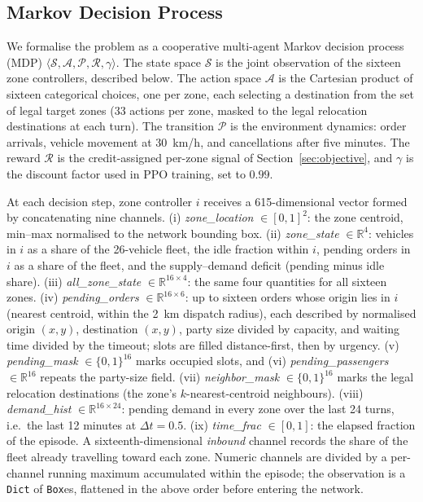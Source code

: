 \documentclass[conference]{IEEEtran}
\begin{document}
\subsection{Markov Decision Process}
\label{sec:mdp}

We formalise the problem as a cooperative multi-agent Markov decision process
(MDP) $\langle \mathcal{S}, \mathcal{A}, \mathcal{P}, \mathcal{R}, \gamma
\rangle$. The state space $\mathcal{S}$ is the joint observation of the sixteen
zone controllers, described below. The action space $\mathcal{A}$ is the
Cartesian product of sixteen categorical choices, one per zone, each selecting
a destination from the set of legal target zones (33 actions per zone, masked
to the legal relocation destinations at each turn). The transition
$\mathcal{P}$ is the environment dynamics: order arrivals, vehicle movement at
30~km/h, and cancellations after five minutes. The reward $\mathcal{R}$ is the
credit-assigned per-zone signal of Section~\ref{sec:objective}, and $\gamma$
is the discount factor used in PPO training, set to $0.99$.

At each decision step, zone controller $i$ receives a 615-dimensional vector
formed by concatenating nine channels. (i) \emph{zone\_location}
$\in[0,1]^2$: the zone centroid, min--max normalised to the network bounding
box. (ii) \emph{zone\_state} $\in\mathbb{R}^4$: vehicles in $i$ as a share of
the 26-vehicle fleet, the idle fraction within $i$, pending orders in $i$ as a
share of the fleet, and the supply--demand deficit (pending minus idle share).
(iii) \emph{all\_zone\_state} $\in\mathbb{R}^{16\times4}$: the same four
quantities for all sixteen zones. (iv) \emph{pending\_orders}
$\in\mathbb{R}^{16\times6}$: up to sixteen orders whose origin lies in $i$
(nearest centroid, within the 2~km dispatch radius), each described by
normalised origin $(x,y)$, destination $(x,y)$, party size divided by
capacity, and waiting time divided by the timeout; slots are filled
distance-first, then by urgency. (v) \emph{pending\_mask} $\in\{0,1\}^{16}$
marks occupied slots, and (vi) \emph{pending\_passengers}
$\in\mathbb{R}^{16}$ repeats the party-size field. (vii)
\emph{neighbor\_mask} $\in\{0,1\}^{16}$ marks the legal relocation
destinations (the zone's $k$-nearest-centroid neighbours). (viii)
\emph{demand\_hist} $\in\mathbb{R}^{16\times24}$: pending demand in every zone
over the last 24 turns, i.e.\ the last 12 minutes at $\Delta t=0.5$. (ix)
\emph{time\_frac} $\in[0,1]$: the elapsed fraction of the episode. A
sixteenth-dimensional \emph{inbound} channel records the share of the fleet
already travelling toward each zone. Numeric channels are divided by a
per-channel running maximum accumulated within the episode; the observation is
a \texttt{Dict} of \texttt{Box}es, flattened in the above order before
entering the network.
\end{document}

